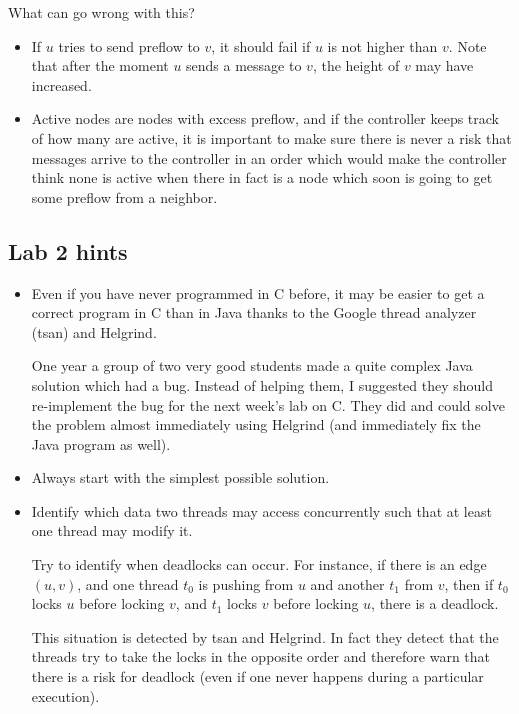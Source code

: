 \documentclass{forsete}
\begin{document}
{What can go wrong with this?
\begin{itemize}
\item If $u$ tries to send preflow to $v$, it should fail if $u$ is not higher than $v$.
Note that after the moment $u$ sends a message to $v$, the height of $v$ may have increased.

\item Active nodes are nodes with excess preflow, and if the controller keeps track of how many are active,
it is important to make sure there is never a risk that messages arrive to the controller in an order which
would make the controller think none is active when there in fact is a node which soon is going to get some
preflow from a neighbor.

\end{itemize}


\subsection*{Lab 2 hints}
\begin{itemize}
\item Even if you have never programmed in C before, it may be easier 
to get a correct program in C than in Java thanks to the Google thread analyzer (tsan) and Helgrind.

One year a group of two very good students made a quite complex Java 
solution which had a bug. Instead of helping them, I suggested they should
re-implement the bug for the next week's lab on C. They did and could solve
the problem almost immediately using Helgrind (and immediately fix the Java program as well).

\item Always start with the simplest possible solution.

\item Identify which data two threads may access concurrently such that at
least one thread may modify it.

Try to identify when deadlocks can occur. For instance, if there is
an edge $(u,v)$, and one thread $t_0$ is pushing from $u$ and another $t_1$
from $v$, then if $t_0$ locks $u$ before locking $v$, and $t_1$ 
locks $v$ before locking $u$, there is a deadlock.

This situation is detected by tsan and Helgrind. In fact they detect
that the threads try to take the locks in the opposite order and therefore
warn that there is a risk for deadlock (even if one never happens during
a particular execution).


\end{itemize}}
\end{document}

